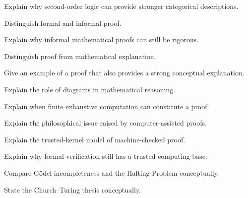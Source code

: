 \begin{exercise}[3]
Explain why second-order logic can provide stronger categorical
descriptions.
\end{exercise}

\begin{exercise}[2]
Distinguish formal and informal proof.
\end{exercise}

\begin{exercise}[3]
Explain why informal mathematical proofs can still be rigorous.
\end{exercise}

\begin{exercise}[2]
Distinguish proof from mathematical explanation.
\end{exercise}

\begin{exercise}[3]
Give an example of a proof that also provides a strong conceptual
explanation.
\end{exercise}

\begin{exercise}[3]
Explain the role of diagrams in mathematical reasoning.
\end{exercise}

\begin{exercise}[3]
Explain when finite exhaustive computation can constitute a proof.
\end{exercise}

\begin{exercise}[3]
Explain the philosophical issue raised by computer-assisted proofs.
\end{exercise}

\begin{exercise}[3]
Explain the trusted-kernel model of machine-checked proof.
\end{exercise}

\begin{exercise}[3]
Explain why formal verification still has a trusted computing base.
\end{exercise}

\begin{exercise}[3]
Compare Gödel incompleteness and the Halting Problem conceptually.
\end{exercise}

\begin{exercise}[2]
State the Church--Turing thesis conceptually.
\end{exercise}

